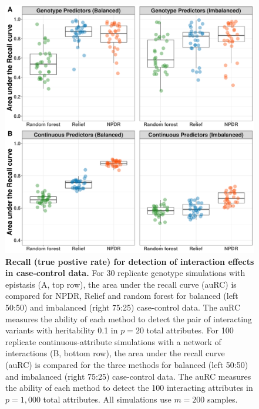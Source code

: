 \documentclass{bioinfo}
\begin{document}
\begin{figure}[!tbp]
\centerline{\includegraphics[scale = 0.34]{../../figs/auRC_comparison_gwas_continuous(balanced_and_imbalanced).pdf}}
\caption{{\bf Recall (true postive rate) for detection of interaction effects in case-control data.} For 30 replicate genotype simulations with epistasis (A, top row), the area under the recall curve (auRC) is compared for NPDR, Relief and random forest for balanced (left 50:50) and  imbalanced (right 75:25) case-control data. The auRC measures the ability of each method to detect the pair of interacting variants with heritability 0.1 in $p=20$ total attributes. For 100 replicate continuous-attribute simulations with a network of interactions (B, bottom row), the area under the recall curve (auRC) is compared for the three methods for balanced (left 50:50) and  imbalanced (right 75:25) case-control data. The auRC measures the ability of each method to detect the 100 interacting attributes in $p=1,000$ total attributes. All simulations use $m = 200$ samples.}
\label{fig:rc_curve}
\end{figure}
\end{document}
